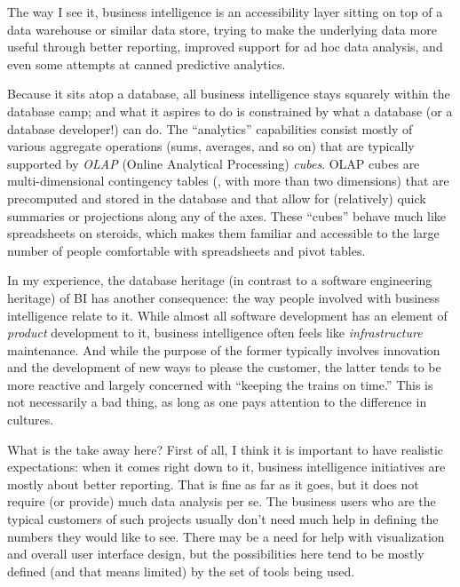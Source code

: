 The way I see it, business intelligence is an accessibility layer
sitting on top of a data warehouse or similar data store, trying
to make the underlying data more useful through better reporting,
improved support for ad hoc data analysis, and even some attempts
at canned predictive analytics.
    
Because it sits atop a database, all business intelligence stays
squarely within the database camp; and what it aspires to do is
constrained by what a database (or a database developer!) can do. The
``analytics'' capabilities consist mostly of various aggregate
operations (sums, averages, and so on) that\vadjust{\pagebreak} are typically supported
by \emph{OLAP} (Online Analytical Processing) \emph{cubes}.  OLAP cubes
are multi-dimensional contingency tables (\ie, with more than two
dimensions) that are precomputed and stored in the database and that
allow for (relatively) quick summaries or projections along any of the
axes.  These ``cubes'' behave much like spreadsheets on steroids,
which makes them familiar and accessible to the large number of people
comfortable with spreadsheets and pivot tables.
    
In my experience, the database heritage (in contrast to a software
engineering heritage) of BI has another consequence: the way people
involved with business intelligence relate to it.  While almost all
software development has an element of \emph{product} development to
it, business intelligence often feels like \emph{infrastructure}
maintenance. And while the purpose of the former typically involves
innovation and the development of new ways to please the customer, the
latter tends to be more reactive and largely concerned with ``keeping
the trains on time.'' This is not necessarily a bad thing, as long as
one pays attention to the difference in cultures.
    
What is the take away here? First of all, I think it is important to
have realistic expectations: when it comes right down to it, business
intelligence initiatives are mostly about better reporting.  That is
fine as far as it goes, but it does not require (or provide) much data
analysis per se. The business users who are the typical customers of
such projects usually don't need much help in defining the numbers
they would like to see. There may be a need for help with
visualization and overall user interface design, but the possibilities
here tend to be mostly defined (and that means limited) by the set of
tools being used.
    
